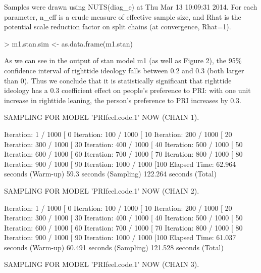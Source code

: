 \documentclass[12pt]{article}
\begin{document}
\begin{enumerate}
\begin{Schunk}
\begin{Soutput}
Samples were drawn using NUTS(diag_e) at Thu Mar 13 10:09:31 2014.
For each parameter, n_eff is a crude measure of effective sample size,
and Rhat is the potential scale reduction factor on split chains (at 
convergence, Rhat=1).
\end{Soutput}
\begin{Sinput}
> m1.stan.sim <- as.data.frame(m1.stan)
\end{Sinput}
\end{Schunk}

As we can see in the output of stan model m1 (as well as Figure 2), the 95\% confidence interval of righttide ideology falls between 0.2 and 0.3 (both larger than 0). Thus we conclude that it is statistically significant that righttide ideology has a 0.3 coefficient effect on people's preference to PRI: with one unit increase in righttide leaning, the person's preference to PRI increases by 0.3.



\begin{Schunk}
\begin{Soutput}
SAMPLING FOR MODEL 'PRIfeel.code.1' NOW (CHAIN 1).

Iteration:   1 / 1000 [  0%
Iteration: 100 / 1000 [ 10%
Iteration: 200 / 1000 [ 20%
Iteration: 300 / 1000 [ 30%
Iteration: 400 / 1000 [ 40%
Iteration: 500 / 1000 [ 50%
Iteration: 600 / 1000 [ 60%
Iteration: 700 / 1000 [ 70%
Iteration: 800 / 1000 [ 80%
Iteration: 900 / 1000 [ 90%
Iteration: 1000 / 1000 [100%
Elapsed Time: 62.964 seconds (Warm-up)
              59.3 seconds (Sampling)
              122.264 seconds (Total)

SAMPLING FOR MODEL 'PRIfeel.code.1' NOW (CHAIN 2).

Iteration:   1 / 1000 [  0%
Iteration: 100 / 1000 [ 10%
Iteration: 200 / 1000 [ 20%
Iteration: 300 / 1000 [ 30%
Iteration: 400 / 1000 [ 40%
Iteration: 500 / 1000 [ 50%
Iteration: 600 / 1000 [ 60%
Iteration: 700 / 1000 [ 70%
Iteration: 800 / 1000 [ 80%
Iteration: 900 / 1000 [ 90%
Iteration: 1000 / 1000 [100%
Elapsed Time: 61.037 seconds (Warm-up)
              60.491 seconds (Sampling)
              121.528 seconds (Total)

SAMPLING FOR MODEL 'PRIfeel.code.1' NOW (CHAIN 3).


\end{Soutput}
\end{Schunk}
\end{enumerate}
\end{document}
